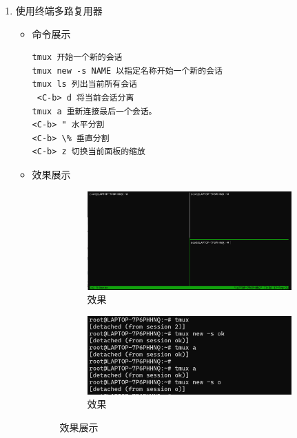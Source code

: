 \documentclass[UTF8]{ctexart}
\begin{document}
\begin{enumerate}
  \item 使用终端多路复用器
  \begin{itemize}
  \item 命令展示
  \begin{verbatim}
tmux 开始一个新的会话
tmux new -s NAME 以指定名称开始一个新的会话
tmux ls 列出当前所有会话
 <C-b> d 将当前会话分离
tmux a 重新连接最后一个会话。
<C-b> " 水平分割
<C-b> \% 垂直分割
<C-b> z 切换当前面板的缩放
  \end{verbatim}\item 效果展示
\begin{figure}[H]
    \centering
    \begin{subfigure}[b]{0.48\textwidth}
        \includegraphics[width=\textwidth]{13} %
        \caption{效果}
        \label{fig:left}
    \end{subfigure}
    \hfill
    \begin{subfigure}[b]{0.48\textwidth}
        \includegraphics[width=\textwidth]{14} %
        \caption{效果}
        \label{fig:right}
    \end{subfigure}
    \caption{效果展示}
    \label{fig:side_by_side}
\end{figure}

  \end{itemize}
\end{enumerate}
\end{document}

